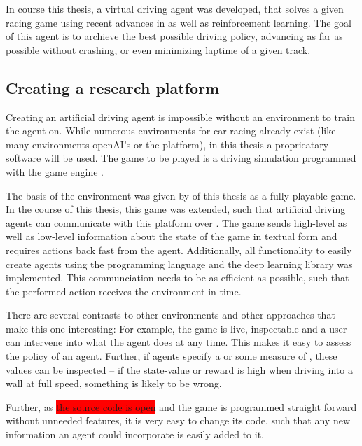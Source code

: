 In course this thesis, a virtual driving agent was developed, that solves a given racing game using recent advances in  as well as reinforcement learning. The goal of this agent is to archieve the best possible driving policy, advancing as far as possible without crashing, or even minimizing laptime of a given track. 

\subsection{Creating a research platform}

Creating an artificial driving agent is impossible without an environment to train the agent on. While numerous environments for car racing already exist (like many environments openAI's  or the  platform), in this thesis a proprieatary software will be used. The game to be played is a driving simulation programmed with the game engine . 

The basis of the environment was given by \leon of this thesis as a fully playable game. In the course of this thesis, this game was extended, such that artificial driving agents can communicate with this platform over . The game sends high-level as well as low-level information about the state of the game in textual form and requires actions back fast from the agent. Additionally, all functionality to easily create agents using the programming language  and the deep learning library  was implemented. This communciation needs to be as efficient as possible, such that the performed action receives the environment in time.

There are several contrasts to other environments and other approaches that make this one interesting: For example, the game is live, inspectable and a user can intervene into what the agent does at any time. This makes it easy to assess the policy of an agent. Further, if agents specify a  or some measure of , these values can be inspected -- if the state-value or reward is high when driving into a wall at full speed, something is likely to be wrong.

Further, as \colorbox{red}{the source code is open} and the game is programmed straight forward without unneeded features, it is very easy to change its code, such that any new information an agent could incorporate is easily added to it.

